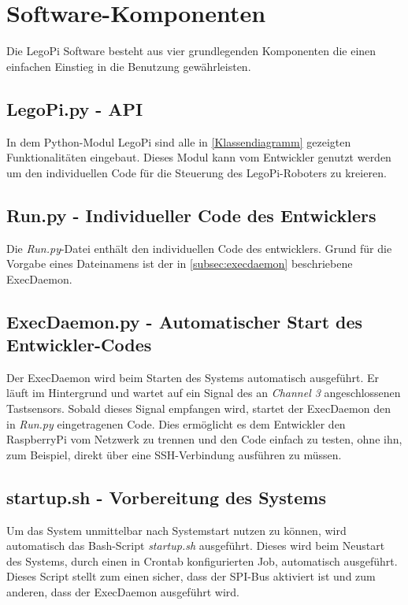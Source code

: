 \section{Software-Komponenten}

Die LegoPi Software besteht aus vier grundlegenden Komponenten die einen einfachen Einstieg in die Benutzung gewährleisten.

\subsection{LegoPi.py - API}

In dem Python-Modul LegoPi sind alle in \autoref{Klassendiagramm} gezeigten Funktionalitäten eingebaut. Dieses Modul kann vom Entwickler genutzt werden um den individuellen Code für die Steuerung des LegoPi-Roboters zu kreieren.  

\subsection{Run.py - Individueller Code des Entwicklers}

Die \emph{Run.py}-Datei enthält den individuellen Code des entwicklers. Grund für die Vorgabe eines Dateinamens ist der in \autoref{subsec:execdaemon} beschriebene ExecDaemon.

\subsection{ExecDaemon.py - Automatischer Start des Entwickler-Codes}
\label{subsec:execdaemon}

Der ExecDaemon wird beim Starten des Systems automatisch ausgeführt. Er läuft im Hintergrund und wartet auf ein Signal des an \emph{Channel 3} angeschlossenen Tastsensors. Sobald dieses Signal empfangen wird, startet der ExecDaemon den in \emph{Run.py} eingetragenen Code. Dies ermöglicht es dem Entwickler den RaspberryPi vom Netzwerk zu trennen und den Code einfach zu testen, ohne ihn, zum Beispiel, direkt über eine SSH-Verbindung ausführen zu müssen.

\subsection{startup.sh - Vorbereitung des Systems}

Um das System unmittelbar nach Systemstart nutzen zu können, wird automatisch das Bash-Script \emph{startup.sh} ausgeführt. Dieses wird beim Neustart des Systems, durch einen in Crontab konfigurierten Job, automatisch ausgeführt. Dieses Script stellt zum einen sicher, dass der SPI-Bus aktiviert ist und zum anderen, dass der ExecDaemon ausgeführt wird.

